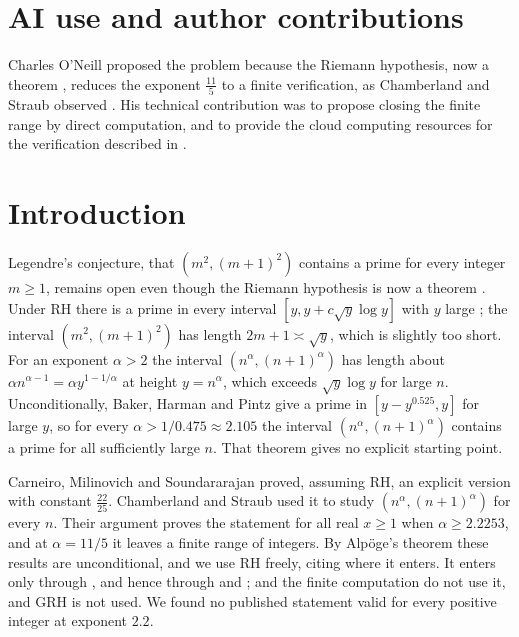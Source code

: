 \documentclass[11pt,colorlinks]{charlie}
\begin{document}
\section*{AI use and author contributions}
\aiusestatement

Charles O'Neill proposed the problem because the Riemann hypothesis, now a theorem \cite{Alpoge}, reduces the exponent $\tfrac{11}{5}$ to a finite verification, as Chamberland and Straub observed \cite{CS}. His technical contribution was to propose closing the finite range by direct computation, and to provide the cloud computing resources for the verification described in . \responsibilitystatement

\section{Introduction}\label{sec:intro}
Legendre's conjecture, that $(m^2,(m+1)^2)$ contains a prime for every integer $m\ge1$, remains open even though the Riemann hypothesis is now a theorem \cite{Alpoge}. Under RH there is a prime in every interval $[y,y+c\sqrt y\log y]$ with $y$ large \cite{Cramer,CMS}; the interval $(m^2,(m+1)^2)$ has length $2m+1\asymp\sqrt y$, which is slightly too short. For an exponent $\alpha>2$ the interval $(n^\alpha,(n+1)^\alpha)$ has length about $\alpha n^{\alpha-1}=\alpha y^{1-1/\alpha}$ at height $y=n^\alpha$, which exceeds $\sqrt y\log y$ for large $n$. Unconditionally, Baker, Harman and Pintz \cite{BHP} give a prime in $[y-y^{0.525},y]$ for large $y$, so for every $\alpha>1/0.475\approx2.105$ the interval $(n^\alpha,(n+1)^\alpha)$ contains a prime for all sufficiently large $n$. That theorem gives no explicit starting point.

Carneiro, Milinovich and Soundararajan \cite{CMS} proved, assuming RH, an explicit version with constant $\tfrac{22}{25}$. Chamberland and Straub \cite{CS} used it to study $(n^\alpha,(n+1)^\alpha)$ for every $n$. Their argument proves the statement for all real $x\ge1$ when $\alpha\ge2.2253$, and at $\alpha=11/5$ it leaves a finite range of integers. By Alp\"oge's theorem \cite{Alpoge} these results are unconditional, and we use RH freely, citing \cite{Alpoge} where it enters. It enters only through , and hence through  and ;  and the finite computation do not use it, and GRH is not used. We found no published statement valid for every positive integer at exponent $2.2$.
\end{document}
